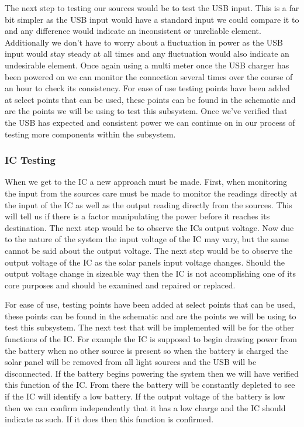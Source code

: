 The next step to testing our sources would be to test the USB input. This is a far bit simpler as the USB input would have a standard input we could compare it to and any difference would indicate an inconsistent or unreliable element. Additionally we don't have to worry about a fluctuation in power as the USB input would stay steady at all times and any fluctuation would also indicate an undesirable element. Once again using a multi meter once the USB charger has been powered on we can monitor the connection several times over the course of an hour to check its consistency. For ease of use testing points have been added at select points that can be used, these points can be found in the schematic and are the points we will be using to test this subsystem. Once we've verified that the USB has expected and consistent power we can continue on in our process of testing more components within the subsystem.

\subsubsection{IC Testing}
When we get to the IC a new approach must be made. First, when monitoring the input from the sources care must be made to monitor the readings directly at the input of the IC as well as the output reading directly from the sources. This will tell us if there is a factor manipulating the power before it reaches its destination. The next step would be to observe the ICs output voltage. Now due to the nature of the system the input voltage of the IC may vary, but the same cannot be said about the output voltage. The next step would be to observe the output voltage of the IC as the solar panels input voltage changes. Should the output voltage change in sizeable way then the IC is not accomplishing one of its core purposes and should be examined and repaired or replaced. 

For ease of use, testing points have been added at select points that can be used, these points can be found in the schematic and are the points we will be using to test this subsystem. The next test that will be implemented will be for the other functions of the IC. For example the IC is supposed to begin drawing power from the battery when no other source is present so when the battery is charged the solar panel will be removed from all light sources and the USB will be disconnected. If the battery begins powering the system then we will have verified this function of the IC. From there the battery will be constantly depleted to see if the IC will identify a low battery. If the output voltage of the battery is low then we can confirm independently that it has a low charge and the IC should indicate as such. If it does then this function is confirmed.

